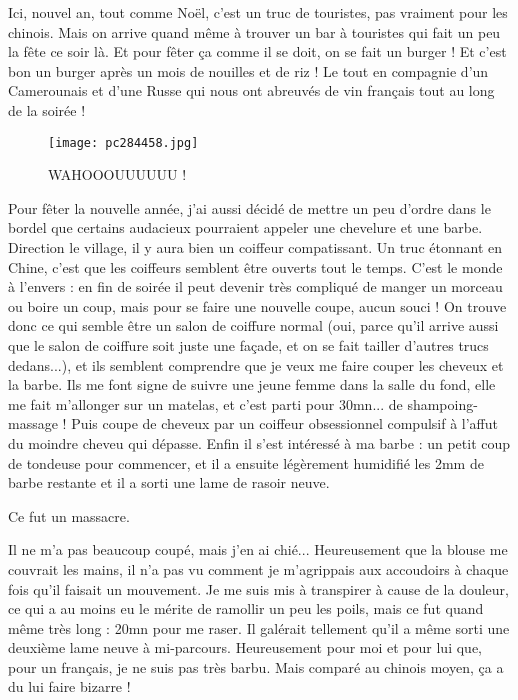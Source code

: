 \documentclass{book}
\begin{document}
Ici, nouvel an, tout comme Noël, c'est un truc de touristes, pas vraiment pour les chinois. Mais on arrive quand même à trouver un bar à touristes qui fait un peu la fête ce soir là. Et pour fêter ça comme il se doit, on se fait un burger ! Et c'est bon un burger après un mois de nouilles et de riz ! Le tout en compagnie d'un Camerounais et d'une Russe qui nous ont abreuvés de vin français tout au long de la soirée !


\begin{figure}[h]
\centering
\texttt{[image: pc284458.jpg]}
\caption*{WAHOOOUUUUUU !}
\end{figure}

Pour fêter la nouvelle année, j'ai aussi décidé de mettre un peu d'ordre dans le bordel que certains audacieux pourraient appeler une chevelure et une barbe. Direction le village, il y aura bien un coiffeur compatissant. Un truc étonnant en Chine, c'est que les coiffeurs semblent être ouverts tout le temps. C'est le monde à l'envers : en fin de soirée il peut devenir très compliqué de manger un morceau ou boire un coup, mais pour se faire une nouvelle coupe, aucun souci ! On trouve donc ce qui semble être un salon de coiffure normal (oui, parce qu'il arrive aussi que le salon de coiffure soit juste une façade, et on se fait tailler d'autres trucs dedans...), et ils semblent comprendre que je veux me faire couper les cheveux et la barbe. Ils me font signe de suivre une jeune femme dans la salle du fond, elle me fait m'allonger sur un matelas, et c'est parti pour 30mn... de shampoing- massage ! Puis coupe de cheveux par un coiffeur obsessionnel compulsif à l'affut du moindre cheveu qui dépasse. Enfin il s'est intéressé à ma barbe : un petit coup de tondeuse pour commencer, et il a ensuite légèrement humidifié les 2mm de barbe restante et il a sorti une lame de rasoir neuve.

Ce fut un massacre.

Il ne m'a pas beaucoup coupé, mais j'en ai chié... Heureusement que la blouse me couvrait les mains, il n'a pas vu comment je m'agrippais aux accoudoirs à chaque fois qu'il faisait un mouvement. Je me suis mis à transpirer à cause de la douleur, ce qui a au moins eu le mérite de ramollir un peu les poils, mais ce fut quand même très long : 20mn pour me raser. Il galérait tellement qu'il a même sorti une deuxième lame neuve à mi-parcours. Heureusement pour moi et pour lui que, pour un français, je ne suis pas très barbu. Mais comparé au chinois moyen, ça a du lui faire bizarre !
\end{document}
